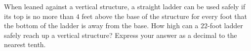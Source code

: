 When leaned against a vertical structure, a straight ladder can be used safely if its top is no more than $4$ feet above the base of the structure for every foot that the bottom of the ladder is away from the base. How high can a $22$-foot ladder safely reach up a vertical structure? Express your answer as a decimal to the nearest tenth.
